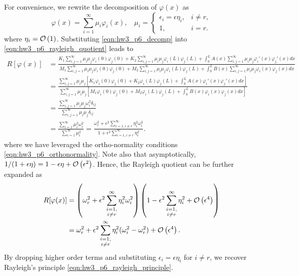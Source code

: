 For convenience, we rewrite the decomposition of $\varphi(x)$ as 
\begin{equation}\label{eqn:hw3_p6_decomp}
    \varphi(x) = \sum_{i=1}^\infty \mu_i \varphi_i(x), ~~~~ \mu_i = \begin{cases}
        \epsilon_i = \epsilon \eta_i, & i \neq r, \\
        1, & i = r.
    \end{cases}
\end{equation}
where $\eta_i = \mathcal{O} \left( 1 \right)$.
Substituting \cref{eqn:hw3_p6_decomp} into \cref{eqn:hw3_p6_rayleigh_quotient} leads to
\begin{equation}
\begin{aligned}
    R[\varphi(x)] &= \frac{
        K_1 \sum_{i,j=1}^\infty \mu_i\mu_j\varphi_i(0)\varphi_j(0) + K_2 \sum_{i,j=1}^\infty \mu_i\mu_j\varphi_i(L)\varphi_j(L) + \int_0^L A(x) \sum_{i,j=1}^\infty \mu_i\mu_j\varphi_i'(x) \varphi_j'(x) dx
    }{
        M_1 \sum_{i,j=1}^\infty \mu_i\mu_j\varphi_i(0)\varphi_j(0) + M_2 \sum_{i,j=1}^\infty \mu_i\mu_j\varphi_i(L)\varphi_j(L) + \int_0^L B(x) \sum_{i,j=1}^\infty \mu_i\mu_j\varphi_i(x) \varphi_j(x) dx
    } \\
    &= \frac{
        \sum_{i,j=1}^\infty \mu_i \mu_j \left[ K_1\varphi_i(0) \varphi_j(0) + K_2\varphi_i(L) \varphi_j(L) + \int_0^L A(x) \varphi_i'(x) \varphi_j'(x) dx \right]
    }{
        \sum_{i,j=1}^\infty \mu_i \mu_j \left[ M_1\varphi_i(0) \varphi_j(0) + M_2\varphi_i(L) \varphi_j(L) + \int_0^L B(x) \varphi_i(x) \varphi_j(x) dx \right]
    } \\
    &= \frac{
        \sum_{i,j=1}^\infty \mu_i \mu_j \omega_i^2 \delta_{ij}
    }{
        \sum_{i,j=1}^\infty \mu_i \mu_j \delta_{ij}
    } \\
    &= \frac{\sum_{i=1}^\infty \mu_i^2 \omega_i^2}{\sum_{i=1}^\infty \mu_i^2} 
    = \frac{\omega_r^2 + \epsilon^2\sum_{i=1, i\neq r}^\infty \eta_i^2 \omega_i^2}{1 + \epsilon^2 \sum_{i=1, i\neq r}^\infty \eta_i^2}.
\end{aligned}
\end{equation}
where we have leveraged the ortho-normality conditions \cref{eqn:hw3_p6_orthonormality}.
Note also that asymptotically, $1 / (1 + \epsilon \eta) = 1 - \epsilon \eta + \mathcal{O} \left( \epsilon^2 \right)$.
Hence, the Rayleigh quotient can be further expanded as 
\begin{equation}
\begin{aligned}
    R[\varphi(x)] &= \left(\omega_r^2 + \epsilon^2 \sum_{\substack{i=1, \\ i\neq r}}^\infty \eta_i^2 \omega_i^2\right) \left(1 - \epsilon^2 \sum_{\substack{i=1, \\ i\neq r}}^\infty \eta_i^2 + \mathcal{O} \left( \epsilon^4 \right) \right) \\
    &= \omega_r^2 + \epsilon^2 \sum_{\substack{i=1, \\ i\neq r}}^\infty \eta_i^2 (\omega_i^2 - \omega_r^2) + \mathcal{O} \left( \epsilon^4 \right).
\end{aligned}
\end{equation}
By dropping higher order terms and substituting $\epsilon_i = \epsilon \eta_i$ for $i \neq r$, we recover Rayleigh's principle \cref{eqn:hw3_p6_rayleigh_principle}.
